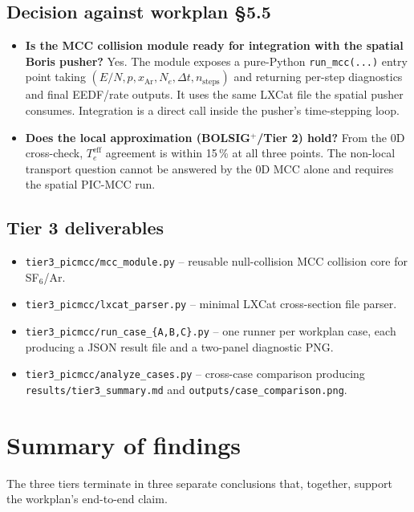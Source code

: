 \documentclass[11pt,a4paper]{article}
\begin{document}
\subsection{Decision against workplan §5.5}
\begin{itemize}
  \item \textbf{Is the MCC collision module ready for
    integration with the spatial Boris pusher?} Yes. The module
    exposes a pure-Python \texttt{run\_mcc(...)} entry point
    taking $(E/N, p, x_{\mathrm{Ar}}, N_e, \Delta t,
    n_{\mathrm{steps}})$ and returning per-step diagnostics
    and final EEDF/rate outputs. It uses the same LXCat file
    the spatial pusher consumes. Integration is a direct call
    inside the pusher's time-stepping loop.
  \item \textbf{Does the local approximation (BOLSIG$^+$/Tier 2)
    hold?} From the 0D cross-check, $T_e^{\mathrm{eff}}$
    agreement is within 15\,\% at all three points. The
    non-local transport question cannot be answered by the
    0D MCC alone and requires the spatial PIC-MCC run.
\end{itemize}

\subsection{Tier 3 deliverables}
\begin{itemize}
  \item \texttt{tier3\_picmcc/mcc\_module.py} -- reusable
    null-collision MCC collision core for SF$_6$/Ar.
  \item \texttt{tier3\_picmcc/lxcat\_parser.py} -- minimal
    LXCat cross-section file parser.
  \item \texttt{tier3\_picmcc/run\_case\_\{A,B,C\}.py} --
    one runner per workplan case, each producing a JSON
    result file and a two-panel diagnostic PNG.
  \item \texttt{tier3\_picmcc/analyze\_cases.py} --
    cross-case comparison producing
    \texttt{results/tier3\_summary.md} and
    \texttt{outputs/case\_comparison.png}.
\end{itemize}

\section{Summary of findings}
\label{sec:summary}

The three tiers terminate in three separate conclusions that,
together, support the workplan's end-to-end claim.
\end{document}
